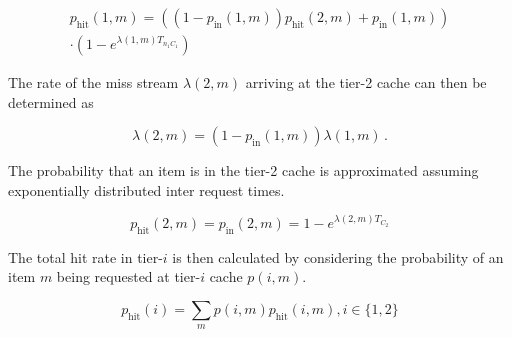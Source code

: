 \begin{multline}
p_\text{hit}(1,m) = ((1-p_\text{in}(1,m))p_\text{hit}(2,m) + p_\text{in}(1,m)) \\ \cdot(1-e^{\lambda(1,m)T_{n_1 C_1}})
\end{multline}

The rate of the miss stream $\lambda(2,m)$ arriving at the tier-2 cache can then be determined as

\begin{equation}
\lambda(2,m) = (1-p_\text{in}(1,m))\lambda(1,m) \, .
\end{equation}

The probability that an item is in the tier-2 cache is approximated assuming exponentially distributed inter request times.

\begin{equation}
p_\text{hit}(2,m) = p_\text{in}(2,m) = 1-e^{\lambda(2,m)T_{C_2}}
\end{equation}

The total hit rate in tier-$i$ is then calculated by considering the probability of an item $m$ being requested at tier-$i$ cache $p(i,m)$.

\begin{equation}
p_\text{hit}(i) = \sum_{m}p(i,m)p_\text{hit}(i,m), i\in\{1,2\}
\end{equation}






